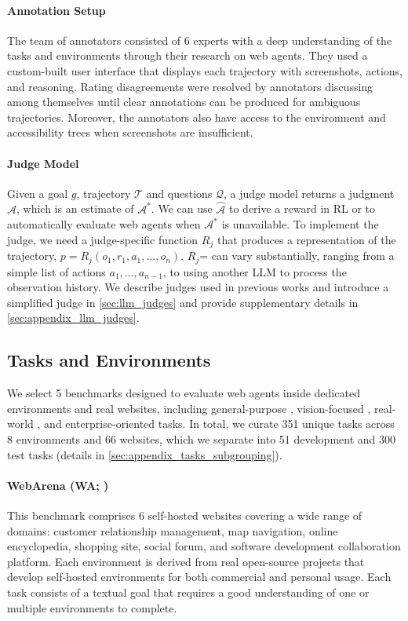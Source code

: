 \documentclass{article} %
\begin{document}
\paragraph{Annotation Setup}
The team of annotators consisted of 6 experts with a deep understanding of the tasks and environments through their research on web agents. They used a custom-built user interface that displays each trajectory with screenshots, actions, and reasoning. Rating disagreements were resolved by annotators discussing among themselves until clear annotations can be produced for ambiguous trajectories. Moreover, the annotators also have access to the environment and accessibility trees when screenshots are insufficient.

\paragraph{Judge Model}
Given a goal $g$, trajectory $\mathcal{T}$ and questions $\mathcal{Q}$, a judge model returns a judgment $\hat{\mathcal{A}}$, which is an estimate of $\mathcal{A}^*$. We can use $\hat{\mathcal{A}}$ to derive a reward in RL or to automatically evaluate web agents when $\mathcal{A}^*$ is unavailable. To implement the judge, we need a judge-specific function $R_j$ that produces a representation of the trajectory, $p = R_j(o_1,r_1,a_1,\dots,o_n)$. $R_j$= can vary substantially, ranging from a simple list of actions $a_1,\dots,a_{n-1}$, to using another LLM to process the observation history. We describe judges used in previous works and introduce a simplified judge in \cref{sec:llm_judges} and provide supplementary details in \cref{sec:appendix_llm_judges}.



\subsection{Tasks and Environments}
\label{sec:tasks_and_environments}

We select 5 benchmarks designed to evaluate web agents inside dedicated environments and real websites, including general-purpose \citep{zhou_webarena_2024}, vision-focused \citep{koh_visualwebarena_2024}, real-world \citep{assistantbench_2024}, and enterprise-oriented \citep{workarena_l1,workarena_l2} tasks.
In total, we curate 351 unique tasks across 8 environments and 66 websites, which we separate into 51 development and 300 test tasks (details in  \cref{sec:appendix_tasks_subgrouping}).

\paragraph{WebArena (WA; \citealt{zhou_webarena_2024})}
This benchmark comprises 6 self-hosted websites covering a wide range of domains: customer relationship management, map navigation, online encyclopedia, shopping site, social forum, and software development collaboration platform. Each environment is derived from real open-source projects that develop self-hosted environments for both commercial and personal usage. Each task consists of a textual goal that requires a good understanding of one or multiple environments to complete.
\end{document}

